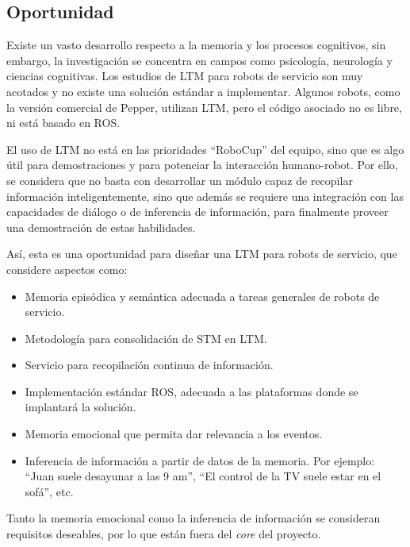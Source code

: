 \subsection{Oportunidad}

Existe un vasto desarrollo respecto a la memoria y los procesos cognitivos, sin embargo, la investigación se concentra en campos como psicología, neurología y ciencias cognitivas. Los estudios de LTM para robots de servicio son muy acotados y no existe una solución estándar a implementar. Algunos robots, como la versión comercial de Pepper, utilizan LTM, pero el código asociado no es libre, ni está basado en ROS.

El uso de LTM no está en las prioridades ``RoboCup'' del equipo, sino que es algo útil para demostraciones y para potenciar la interacción humano-robot. Por ello, se considera que no basta con desarrollar un módulo capaz de recopilar información inteligentemente, sino que además se requiere una integración con las capacidades de diálogo o de inferencia de información, para finalmente proveer una demostración de estas habilidades.

Así, esta es una oportunidad para diseñar una LTM para robots de servicio, que considere aspectos como: 
\begin{itemize}
\item Memoria episódica y semántica adecuada a tareas generales de robots de servicio.
\item Metodología para consolidación de STM en LTM.
\item Servicio para recopilación continua de información.
\item Implementación estándar ROS, adecuada a las plataformas donde se implantará la solución.
\item Memoria emocional que permita dar relevancia a los eventos.
\item Inferencia de información a partir de datos de la memoria. Por ejemplo: ``Juan suele desayunar a las 9 am'', ``El control de la TV suele estar en el sofá'', etc.
\end{itemize}

Tanto la memoria emocional como la inferencia de información se consideran requisitos deseables, por lo que están fuera del \textit{core} del proyecto.

